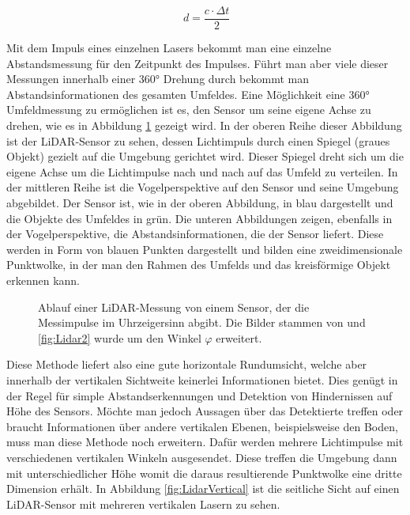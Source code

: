 \begin{equation}
\label{eq:LidarDistance}
\ d = \frac{c\cdot\Delta t}{2}
\end{equation} 

Mit dem Impuls eines einzelnen Lasers bekommt man eine einzelne Abstandsmessung für den Zeitpunkt des Impulses. Führt man aber viele dieser Messungen innerhalb einer 360° Drehung durch bekommt man Abstandsinformationen des gesamten Umfeldes. Eine Möglichkeit eine 360° Umfeldmessung zu ermöglichen ist es, den Sensor um seine eigene Achse zu drehen, wie es in Abbildung \ref{fig:Lidar} gezeigt wird. In der oberen Reihe dieser Abbildung ist der LiDAR-Sensor zu sehen, dessen Lichtimpuls durch einen Spiegel (graues Objekt) gezielt auf die Umgebung gerichtet wird. Dieser Spiegel dreht sich um die eigene Achse um die Lichtimpulse nach und nach auf das Umfeld zu verteilen. In der mittleren Reihe ist die Vogelperspektive auf den Sensor und seine Umgebung abgebildet. Der Sensor ist, wie in der oberen Abbildung, in blau dargestellt und die Objekte des Umfeldes in grün. Die unteren Abbildungen zeigen, ebenfalls in der Vogelperspektive, die Abstandsinformationen, die der Sensor liefert. Diese werden in Form von blauen Punkten dargestellt und bilden eine zweidimensionale Punktwolke, in der man den Rahmen des Umfelds und das kreisförmige Objekt erkennen kann.\\

\begin{figure}%
    \centering
    \qquad
    \qquad
    \caption{Ablauf einer LiDAR-Messung von einem Sensor, der die Messimpulse im Uhrzeigersinn abgibt. Die Bilder stammen von \cite{bib:LidarPictures} und \ref {fig:Lidar2} wurde um den Winkel $\varphi$ erweitert.}\label{fig:Lidar}%
\end{figure}

Diese Methode liefert also eine gute horizontale Rundumsicht, welche aber innerhalb der vertikalen Sichtweite keinerlei Informationen bietet. Dies genügt in der Regel für simple Abstandserkennungen und Detektion von Hindernissen auf Höhe des Sensors. Möchte man jedoch Aussagen über das Detektierte treffen oder braucht Informationen über andere vertikalen Ebenen, beispielsweise den Boden, muss man diese Methode noch erweitern. Dafür werden mehrere Lichtimpulse mit verschiedenen vertikalen Winkeln ausgesendet. Diese treffen die Umgebung dann mit unterschiedlicher Höhe womit die daraus resultierende Punktwolke eine dritte Dimension erhält. In Abbildung \ref{fig:LidarVertical} ist die seitliche Sicht auf einen LiDAR-Sensor mit mehreren vertikalen Lasern zu sehen.\\

